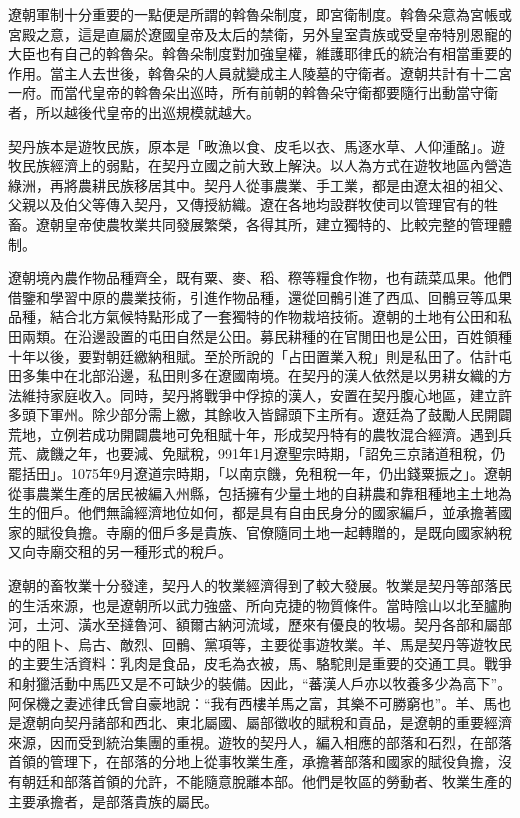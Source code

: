 遼朝軍制十分重要的一點便是所謂的斡魯朵制度，即宮衛制度。斡魯朵意為宮帳或宮殿之意，這是直屬於遼國皇帝及太后的禁衛，另外皇室貴族或受皇帝特別恩寵的大臣也有自己的斡魯朵。斡魯朵制度對加強皇權，維護耶律氏的統治有相當重要的作用。當主人去世後，斡魯朵的人員就變成主人陵墓的守衛者。遼朝共計有十二宮一府。而當代皇帝的斡魯朵出巡時，所有前朝的斡魯朵守衛都要隨行出動當守衛者，所以越後代皇帝的出巡規模就越大。

契丹族本是遊牧民族，原本是「畋漁以食、皮毛以衣、馬逐水草、人仰湩酩」。遊牧民族經濟上的弱點，在契丹立國之前大致上解決。以人為方式在遊牧地區內營造綠洲，再將農耕民族移居其中。契丹人從事農業、手工業，都是由遼太祖的祖父、父親以及伯父等傳入契丹，又傳授紡織。遼在各地均設群牧使司以管理官有的牲畜。遼朝皇帝使農牧業共同發展繁榮，各得其所，建立獨特的、比較完整的管理體制。

遼朝境內農作物品種齊全，既有粟、麥、稻、穄等糧食作物，也有蔬菜瓜果。他們借鑒和學習中原的農業技術，引進作物品種，還從回鶻引進了西瓜、回鶻豆等瓜果品種，結合北方氣候特點形成了一套獨特的作物栽培技術。遼朝的土地有公田和私田兩類。在沿邊設置的屯田自然是公田。募民耕種的在官閒田也是公田，百姓領種十年以後，要對朝廷繳納租賦。至於所說的「占田置業入稅」則是私田了。估計屯田多集中在北部沿邊，私田則多在遼國南境。在契丹的漢人依然是以男耕女織的方法維持家庭收入。同時，契丹將戰爭中俘掠的漢人，安置在契丹腹心地區，建立許多頭下軍州。除少部分需上繳，其餘收入皆歸頭下主所有。遼廷為了鼓勵人民開闢荒地，立例若成功開闢農地可免租賦十年，形成契丹特有的農牧混合經濟。遇到兵荒、歲饑之年，也要減、免賦稅，991年1月遼聖宗時期，「詔免三京諸道租稅，仍罷括田」。1075年9月遼道宗時期，「以南京饑，免租稅一年，仍出錢粟振之」。遼朝從事農業生產的居民被編入州縣，包括擁有少量土地的自耕農和靠租種地主土地為生的佃戶。他們無論經濟地位如何，都是具有自由民身分的國家編戶，並承擔著國家的賦役負擔。寺廟的佃戶多是貴族、官僚隨同土地一起轉贈的，是既向國家納稅又向寺廟交租的另一種形式的稅戶。

遼朝的畜牧業十分發達，契丹人的牧業經濟得到了較大發展。牧業是契丹等部落民的生活來源，也是遼朝所以武力強盛、所向克捷的物質條件。當時陰山以北至臚朐河，土河、潢水至撻魯河、額爾古納河流域，歷來有優良的牧場。契丹各部和屬部中的阻卜、烏古、敵烈、回鶻、黨項等，主要從事遊牧業。羊、馬是契丹等遊牧民的主要生活資料：乳肉是食品，皮毛為衣被，馬、駱駝則是重要的交通工具。戰爭和射獵活動中馬匹又是不可缺少的裝備。因此，“蕃漢人戶亦以牧養多少為高下”。阿保機之妻述律氏曾自豪地說：“我有西樓羊馬之富，其樂不可勝窮也”。羊、馬也是遼朝向契丹諸部和西北、東北屬國、屬部徵收的賦稅和貢品，是遼朝的重要經濟來源，因而受到統治集團的重視。遊牧的契丹人，編入相應的部落和石烈，在部落首領的管理下，在部落的分地上從事牧業生產，承擔著部落和國家的賦役負擔，沒有朝廷和部落首領的允許，不能隨意脫離本部。他們是牧區的勞動者、牧業生產的主要承擔者，是部落貴族的屬民。


